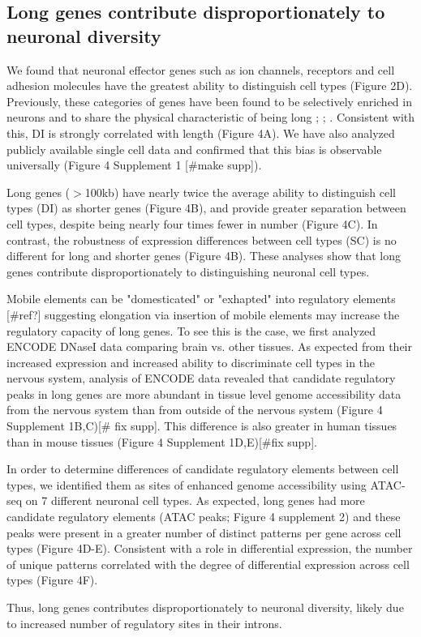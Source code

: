 \subsection{Long genes contribute disproportionately to neuronal diversity}

We found that neuronal effector genes such as ion channels, receptors and cell adhesion molecules have the greatest ability to distinguish cell types (Figure 2D). Previously, these categories of genes have been found to be selectively enriched in neurons and to share the physical characteristic of being long \cite{Sugino_2014}; \cite{Gabel_2015}; \cite{Zylka_2015}. Consistent with this, DI is strongly correlated with length (Figure 4A). We have also analyzed publicly available single cell data and confirmed that this bias is observable universally (Figure 4 Supplement 1 [#make supp]). 

Long genes ($\gt$100kb) have nearly twice the average ability to distinguish cell types (DI) as shorter genes (Figure 4B), and provide greater separation between cell types, despite being nearly four times fewer in number (Figure 4C). In contrast, the robustness of expression differences between cell types (SC) is no different for long and shorter genes (Figure 4B). These analyses show that long genes contribute disproportionately to distinguishing neuronal cell types. 

Mobile elements can be "domesticated" or "exhapted" into regulatory elements [#ref?] suggesting elongation via insertion of mobile elements may increase the regulatory capacity of long genes. To see this is the case, we first analyzed ENCODE DNaseI data comparing brain vs. other tissues. As expected from their increased expression and increased ability to discriminate cell types in the nervous system, analysis of ENCODE data revealed that candidate regulatory peaks in long genes are more abundant in tissue level genome accessibility data from the nervous system than from outside of the nervous system (Figure 4 Supplement 1B,C)[# fix supp]. This difference is also greater in human tissues than in mouse tissues (Figure 4 Supplement 1D,E)[#fix supp].

In order to determine differences of candidate regulatory elements between cell types, we identified them as sites of enhanced genome accessibility using ATAC-seq \cite{Buenrostro_2013} on 7 different neuronal cell types. As expected, long genes had more candidate regulatory elements (ATAC peaks; Figure 4 supplement 2) and these peaks were present in a greater number of distinct patterns per gene across cell types (Figure 4D-E). Consistent with a role in differential expression, the number of unique patterns correlated with the degree of differential expression across cell types (Figure 4F).

Thus, long genes contributes disproportionately to neuronal diversity, likely due to increased number of regulatory sites in their introns. 


